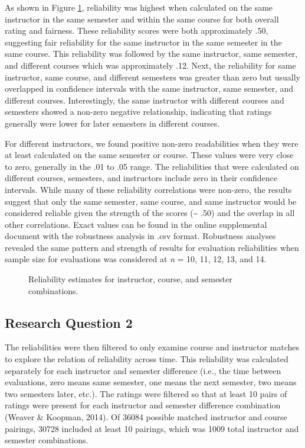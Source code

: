 \documentclass[
  man]{apa7}
\makeatletter
\newcommand*\pandocbounded[1]{%
  \sbox\pandoc@box{#1}%
  \Gscale@div\@tempa{\textheight}{\dimexpr\ht\pandoc@box+\dp\pandoc@box\relax}%
  \Gscale@div\@tempb{\linewidth}{\wd\pandoc@box}%
  \ifdim\@tempb\p@<\@tempa\p@\let\@tempa\@tempb\fi%
  \ifdim\@tempa\p@<\p@\scalebox{\@tempa}{\usebox\pandoc@box}%
  \else\usebox{\pandoc@box}%
  \fi%
}
\makeatother
\begin{document}
As shown in Figure \ref{fig:figure1}, reliability was highest when
calculated on the same instructor in the same semester and within the
same course for both overall rating and fairness. These reliability
scores were both approximately .50, suggesting fair reliability for the
same instructor in the same semester in the same course. This
reliability was followed by the same instructor, same semester, and
different courses which was approximately .12. Next, the reliability for
same instructor, same course, and different semesters was greater than
zero but usually overlapped in confidence intervals with the same
instructor, same semester, and different courses. Interestingly, the
same instructor with different courses and semesters showed a non-zero
negative relationship, indicating that ratings generally were lower for
later semesters in different courses.

For different instructors, we found positive non-zero readabilities when
they were at least calculated on the same semester or course. These
values were very close to zero, generally in the .01 to .05 range. The
reliabilities that were calculated on different courses, semesters, and
instructors include zero in their confidence intervals. While many of
these reliability correlations were non-zero, the results suggest that
only the same semester, same course, and same instructor would be
considered reliable given the strength of the scores (\textasciitilde{} .50) and the
overlap in all other correlations. Exact values can be found in the
online supplemental document with the robustness analysis in .csv
format. Robustness analyses revealed the same pattern and strength of
results for evaluation reliabilities when sample size for evaluations
was considered at \emph{n} = 10, 11, 12, 13, and 14.

\begin{figure}
\centering
\pandocbounded{\texttt{[image: PG\_Manuscript\_2023\_files/figure-latex/figure1-1.pdf]}}
\caption{\label{fig:figure1}Reliability estimates for instructor, course, and semester combinations.}
\end{figure}

\subsection{Research Question 2}\label{research-question-2-1}

The reliabilities were then filtered to only examine course and
instructor matches to explore the relation of reliability across time.
This reliability was calculated separately for each instructor and
semester difference (i.e., the time between evaluations, zero means same
semester, one means the next semester, two means two semesters later,
etc.). The ratings were filtered so that at least 10 pairs of ratings
were present for each instructor and semester difference combination
(Weaver \& Koopman, 2014). Of 36084 possible matched instructor and
course pairings,
30728 included at
least 10 pairings, which was 1009 total instructor and
semester combinations.
\end{document}
